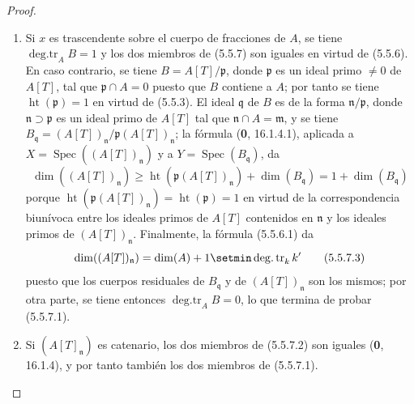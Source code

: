 \begin{proof}
\begin{enumerate}
\item[(i)] Si $x$ es trascendente sobre el cuerpo de fracciones de $A$, se
tiene $\operatorname{deg.tr}_A B=1$ y los dos miembros de (5.5.7) son iguales
en virtud de (5.5.6). En caso contrario, se tiene $B=A[T]/\mathfrak p$, donde
$\mathfrak p$ es un ideal primo $\ne0$ de $A[T]$, tal que
$\mathfrak p\cap A=0$ puesto que $B$ contiene a $A$; por tanto se tiene
$\operatorname{ht}(\mathfrak p)=1$ en virtud de (5.5.3). El ideal
$\mathfrak q$ de $B$ es de la forma $\mathfrak n/\mathfrak p$, donde
$\mathfrak n\supset\mathfrak p$ es un ideal primo de $A[T]$ tal que
$\mathfrak n\cap A=\mathfrak m$, y se tiene
$B_{\mathfrak q}=(A[T])_{\mathfrak n}/\mathfrak p(A[T])_{\mathfrak n}$;
la fórmula (\textbf 0, 16.1.4.1), aplicada a
$X=\operatorname{Spec}((A[T])_{\mathfrak n})$ y a
$Y=\operatorname{Spec}(B_{\mathfrak q})$, da
\begin{equation}
\dim((A[T])_{\mathfrak n})
\geq\operatorname{ht}(\mathfrak p(A[T])_{\mathfrak n})
+\dim(B_{\mathfrak q})=1+\dim(B_{\mathfrak q})
\tag{5.5.7.2}\label{IV.2.s5.5.7.2-fr}
\end{equation}
porque $\operatorname{ht}(\mathfrak p(A[T])_{\mathfrak n})
=\operatorname{ht}(\mathfrak p)=1$ en virtud de la correspondencia biunívoca
entre los ideales primos de $A[T]$ contenidos en $\mathfrak n$ y los ideales
primos de $(A[T])_{\mathfrak n}$. Finalmente, la fórmula (5.5.6.1) da
\begin{equation}
\dim((A[T])_{\mathfrak n})
=\dim(A)+1\setmin\operatorname{deg.tr}_k k'
\tag{5.5.7.3}\label{IV.2.s5.5.7.3-fr}
\end{equation}
puesto que los cuerpos residuales de $B_{\mathfrak q}$ y de
$(A[T])_{\mathfrak n}$ son los mismos; por otra parte, se tiene entonces
$\operatorname{deg.tr}_A B=0$, lo que termina de probar (5.5.7.1).
\item[(ii)] Si $(A[T]_{\mathfrak n})$ es catenario, los dos miembros de
(5.5.7.2) son iguales (\textbf 0, 16.1.4), y por tanto también los dos miembros de
(5.5.7.1).
\end{enumerate}
\end{proof}

